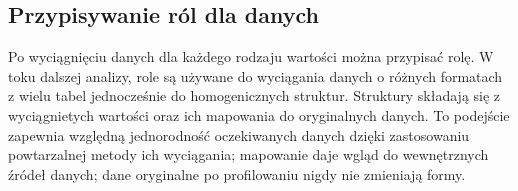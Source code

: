 \newpage
\footnotesize

\normalsize
\newpage




\subsection{Przypisywanie ról dla danych}

Po wyciągnięciu danych dla każdego rodzaju wartości można 
przypisać rolę. W toku dalszej analizy, role są używane do
wyciągania danych o różnych formatach z wielu tabel jednocześnie
do homogenicznych struktur. Struktury składają się z wyciągnietych
wartości oraz ich mapowania do oryginalnych danych.
To podejście zapewnia względną jednorodność oczekiwanych danych
dzięki zastosowaniu powtarzalnej metody ich wyciągania;
mapowanie daje wgląd do wewnętrznych źródeł danych; dane oryginalne
po profilowaniu nigdy nie zmieniają formy.

